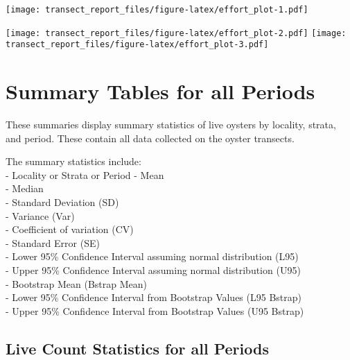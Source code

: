 \documentclass[
]{article}
\begin{document}
\texttt{[image: transect\_report\_files/figure-latex/effort\_plot-1.pdf]}

\texttt{[image: transect\_report\_files/figure-latex/effort\_plot-2.pdf]}
\texttt{[image: transect\_report\_files/figure-latex/effort\_plot-3.pdf]}
\newpage

\hypertarget{summary-tables-for-all-periods}{%
\section{Summary Tables for all
Periods}\label{summary-tables-for-all-periods}}

These summaries display summary statistics of live oysters by locality,
strata, and period. These contain all data collected on the oyster
transects.

The summary statistics include:\\
- Locality or Strata or Period - Mean\\
- Median\\
- Standard Deviation (SD)\\
- Variance (Var)\\
- Coefficient of variation (CV)\\
- Standard Error (SE)\\
- Lower 95\% Confidence Interval assuming normal distribution (L95)\\
- Upper 95\% Confidence Interval assuming normal distribution (U95)\\
- Bootstrap Mean (Bstrap Mean)\\
- Lower 95\% Confidence Interval from Bootstrap Values (L95 Bstrap)\\
- Upper 95\% Confidence Interval from Bootstrap Values (U95 Bstrap)

\hypertarget{live-count-statistics-for-all-periods}{%
\subsection{Live Count Statistics for all
Periods}\label{live-count-statistics-for-all-periods}}
\end{document}
